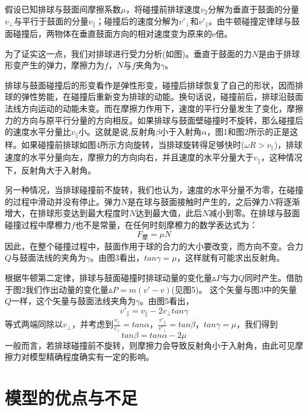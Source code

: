 \documentclass[withoutpreface,bwprint]{cumcmthesis} %
\begin{document}
假设已知排球与鼓面间摩擦系数$\mu$，将碰撞前排球速度$v_2$分解为垂直于鼓面的分量$v_\bot$与平行于鼓面的分量$v_\parallel$；碰撞后的速度分解为$v'_\bot$和$v'_\parallel$。由牛顿碰撞定律球与鼓面碰撞后，两物体在垂直鼓面方向的相对速度变为原来的e倍。

为了证实这一点，我们对排球进行受力分析(如图)。垂直于鼓面的力$N$是由于排球形变产生的弹力，摩擦力为$f$，$N$与$f$夹角为$\gamma$。

排球与鼓面碰撞后的形变看作是弹性形变，碰撞后排球恢复了自己的形状，因而排球的弹性势能，在碰撞后重新变为排球的动能。换句话说，碰撞前后，排球沿鼓面法线方向运动的动能未变。而在摩擦力作用下，速度的平行分量发生了变化，摩擦力的方向与原平行分量的方向相反。如果排球与鼓面壁碰撞时不旋转，那么碰撞后的速度水平分量比$v_\parallel$小。这就是说,反射角$\beta$小于入射角$\alpha$，图1和图2所示的正是这样。如果碰撞前排球如图4所示方向旋转，当排球旋转得足够快时($\omega R>v_\parallel$)，排球速度的水平分量向左，摩擦力的方向向右，并且速度的水平分量大于$v_\parallel$，这种情况下，反射角大于入射角。

另一种情况，当排球碰撞前不旋转，我们也认为，速度的水平分量不为零，在碰撞的过程中滑动并没有停止。弹力$N$是在球与鼓面接触时产生的，之后弹力$N$将逐渐增大，在排球形变达到最大程度时$N$达到最大值，此后$N$减小到零。在排球与鼓面碰撞过程中摩檫力$f$也不是常量，在任何时刻摩檫力的数学表达式为：
\begin{equation*}
	F_\textrm{摩}=\mu N
\end{equation*}
因此，在整个碰撞过程中，鼓面作用于球的合力的大小要改变，而方向不变。合力$Q$与鼓面法线的夹角为$\gamma$。由图3看出，$tan\gamma=\mu$，这样就有可能求出反射角。

根据牛顿第二定律，排球与鼓面碰撞时排球动量的变化量$\vartriangle P$与力$Q$同时产生。借肋于图2我们作出动量的变化量$\vartriangle P=m(v'-v)$(见图5)。
这个矢量与图3中的矢量$Q$一样，这个矢量与鼓面法线夹角为$\gamma$。由图5看出，
\begin{equation*}
	v'_\parallel=v_\parallel-2v_\bot tan\gamma
\end{equation*}
等式两端同除以$v_\bot$，并考虑到$\frac{v_\parallel}{v_\bot}=tan\alpha$，$\frac{v'_\parallel}{v'_\bot}=tan\beta$，$tan\gamma=\mu$，我们得到
\begin{equation*}
	tan\beta=tan\alpha-2\mu
\end{equation*}
一般而言，若排球碰撞前不旋转，则摩擦力会导致反射角小于入射角，由此可见摩擦力对模型精确程度确实有一定的影响。
\section{模型的优点与不足}
\end{document}
